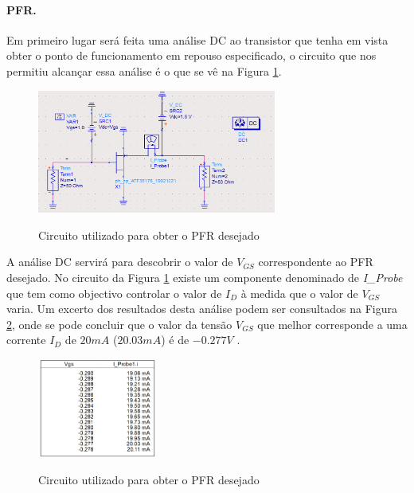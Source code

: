 \documentclass[11pt]{article}
\numberwithin{equation}{section}
\begin{document}
\paragraph{PFR.}

Em primeiro lugar será feita uma análise DC ao transistor que tenha em vista obter o ponto de funcionamento em repouso especificado, o circuito que nos permitiu alcançar essa análise é o que se vê na Figura \ref{fig:Circuito_0}.

\begin{figure}[H]
	\centering
	\includegraphics[width=0.7\textwidth]{./imagens/Circuito_0}~\\
	\caption{Circuito utilizado para obter o PFR desejado}
	\label{fig:Circuito_0}
\end{figure}

A análise DC servirá para descobrir o valor de $ V_{GS} $ correspondente ao PFR desejado. No circuito da Figura \ref{fig:Circuito_0} existe um componente denominado de \textit{I\_Probe} que tem como objectivo controlar o valor de $ I_{D} $ à medida que o valor de $ V_{GS} $ varia. Um excerto dos resultados desta análise podem ser consultados na Figura \ref{fig:VGS}, onde se pode concluir que o valor da tensão  $ V_{GS} $ que melhor corresponde a uma corrente  $ I_{D} $ de $ 20 mA $ ($20.03 mA$) é de  $ -0.277 V $ .

\begin{figure}[H]
	\centering
	\includegraphics[width=0.35\textwidth]{./imagens/Vgs}~\\
	\caption{Circuito utilizado para obter o PFR desejado}
	\label{fig:VGS}
\end{figure}
\end{document}
